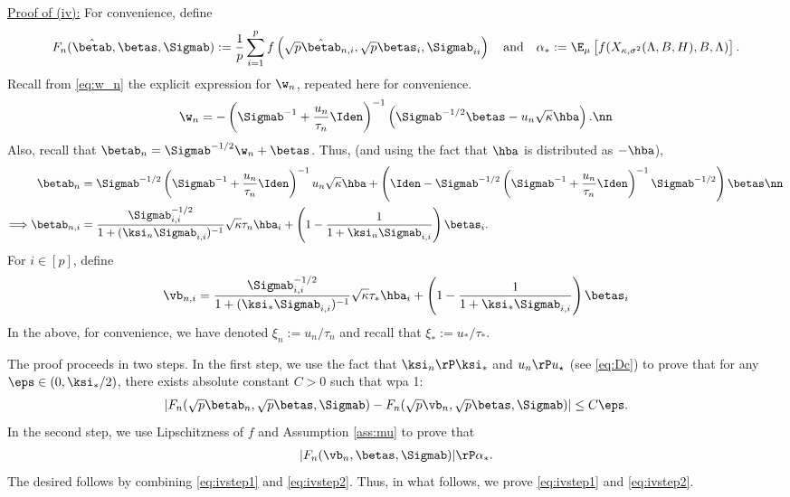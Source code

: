 \vp\noindent\underline{Proof of (iv):} 
For convenience, define 
$$F_n(\hat\betab,\betas,\Sigmab):=\frac{1}{p} \sum_{i=1}^{p} f\left(\sqrt{p}\hat\betab_{n,i},\sqrt{p}\betas_{i},\Sigmab_{ii}\right)\quad\text{and}\quad\alpha_*:=\E_\mu\left[f(X_{\kappa,\sigma^2}(\Lambda,B,H),B,\Lambda)\right].$$
Recall from \eqref{eq:w_n} the explicit expression for $\w_n$, repeated here for convenience.
\begin{align}
\w_n = -\left(\Sigmab^{-1}+\frac{u_n}{\tau_n}\Iden\right)^{-1}\left(\Sigmab^{-1/2}\betas-u_n\sqrt{\kappa}\hba\right).\nn
\end{align}
Also, recall that $\betab_n = \Sigmab^{-1/2}\w_n+\betas$. Thus,  (and using the fact that $\hba$ is distributed as $-\hba$),
\begin{align}
\betab_n &=\Sigmab^{-1/2}\left(\Sigmab^{-1}+\frac{u_n}{\tau_n}\Iden\right)^{-1}u_n\sqrt{\kappa}\hba + \left(\Iden-\Sigmab^{-1/2}\left(\Sigmab^{-1}+\frac{u_n}{\tau_n}\Iden\right)^{-1}\Sigmab^{-1/2}\right)\betas\nn\\
\Longrightarrow\betab_{n,i}&=\frac{{\Sigmab_{i,i}^{-1/2}}}{1+(\ksi_n\Sigmab_{i,i})^{-1}}\sqrt{\kappa}\tau_n\hba_i +\left(1-\frac{1}{1+\ksi_n\Sigmab_{i,i}}\right)\betas_i.
\end{align}
For $i\in[p]$, define 
\begin{align}
\vb_{n,i} = \frac{{\Sigmab_{i,i}^{-1/2}}}{1+(\ksi_*\Sigmab_{i,i})^{-1}}\sqrt{\kappa}\tau_*\hba_i +\left(1-\frac{1}{1+\ksi_*\Sigmab_{i,i}}\right)\betas_i
\end{align}
In the above, for convenience, we have denoted $\xi_n:=u_n/\tau_n$ and recall that $\xi_*:=u_*/\tau_*$. 


The proof proceeds in two steps. In the first step, we use the fact that $\ksi_n\rP\ksi_*$ and $u_n\rP u_\star$ (see \eqref{eq:Dc}) to prove that for any $\eps\in(0,\ksi_*/2)$, there exists absolute constant $C>0$ such that wpa 1:
\begin{align}\label{eq:ivstep1}
|F_n(\sqrt{p}\betab_n,\sqrt{p}\betas,\Sigmab) - F_n(\sqrt{p}\vb_n,\sqrt{p}\betas,\Sigmab) | \leq C\eps.
\end{align}
In the second step, we use Lipschitzness of $f$ and Assumption \ref{ass:mu} to prove that 
\begin{align}
|F_n(\vb_n,\betas,\Sigmab)| \rP \alpha_*.\label{eq:ivstep2}
\end{align}
The desired follows by combining \eqref{eq:ivstep1} and \eqref{eq:ivstep2}. Thus, in what follows, we prove \eqref{eq:ivstep1} and \eqref{eq:ivstep2}.


